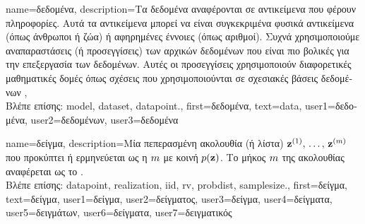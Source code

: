 {name={\foreignlanguage{greek}{δεδομένα}},
	 description={\foreignlanguage{greek}{Τα δεδομένα αναφέρονται σε αντικείμενα που φέρουν} 
	 	\foreignlanguage{greek}{πληροφορίες. Αυτά τα αντικείμενα μπορεί να είναι συγκεκριμένα φυσικά αντικείμενα 
		(όπως άνθρωποι ή ζώα) ή αφηρημένες έννοιες (όπως αριθμοί).  Συχνά χρησιμοποιούμε αναπαραστάσεις (ή 
	 	προσεγγίσεις) των αρχικών δεδομένων που είναι πιο βολικές για την επεξεργασία των δεδομένων. 
		Αυτές οι προσεγγίσεις χρησιμοποιούν διαφορετικές μαθηματικές δομές όπως σχέσεις που χρησιμοποιούνται 
		σε σχεσιακές βάσεις δεδομένων} \cite{codd1970relational}, \cite{silberschatz2019database}\\
		\foreignlanguage{greek}{Βλέπε επίσης:} \gls{model}, \gls{dataset}, \gls{datapoint}.}, 
	first={\foreignlanguage{greek}{δεδομένα}},
	text={data},
	user1={\foreignlanguage{greek}{δεδομένα}}, %
  	user2={\foreignlanguage{greek}{δεδομένων}}, %
	user3={\foreignlanguage{greek}{δεδομένα}} %
}

{name={\foreignlanguage{greek}{δείγμα}},
	description={\foreignlanguage{greek}{Μία} 
		\foreignlanguage{greek}{πεπερασμένη ακολουθία (ή λίστα)} \linebreak ${\bf z}^{(1)}, \,\ldots, \,{\bf z}^{(m)}$ 
		\foreignlanguage{greek}{που προκύπτει ή ερμηνεύεται ως η}  $m$    
		\foreignlanguage{greek}{με κοινή}  $p({\bf z})$. \foreignlanguage{greek}{Το μήκος $m$ της  
		ακολουθίας αναφέρεται ως το} .\\
		\foreignlanguage{greek}{Βλέπε επίσης:} \gls{datapoint}, \gls{realization}, \gls{iid}, \gls{rv}, \gls{probdist}, \gls{samplesize}.},
	first={\foreignlanguage{greek}{δείγμα}},
	text={\foreignlanguage{greek}{δείγμα}},
	user1={\foreignlanguage{greek}{δείγμα}}, %
	user2={\foreignlanguage{greek}{δείγματος}}, %
	user3={\foreignlanguage{greek}{δείγμα}}, %
	user4={\foreignlanguage{greek}{δείγματα}}, %
	user5={\foreignlanguage{greek}{δειγμάτων}}, %
	user6={\foreignlanguage{greek}{δείγματα}}, %
	user7={\foreignlanguage{greek}{δειγματικός}} %
}

